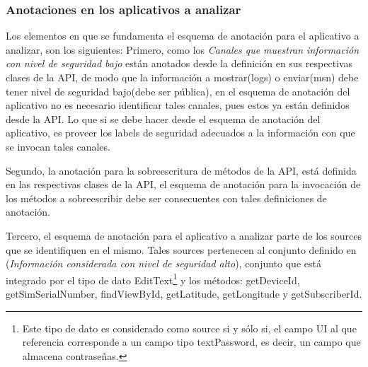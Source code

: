 \subsubsection{Anotaciones en los aplicativos a analizar}
Los elementos en que se fundamenta el esquema de anotación para el aplicativo a
analizar, son los siguientes:\newline 
Primero, como los \textit{Canales que muestran
información con nivel de seguridad bajo} están anotados desde la definición en
sus respectivas clases de la API, de modo que la información a mostrar(logs) o
enviar(msn) debe tener nivel de seguridad bajo(debe ser pública), en el esquema
de anotación del aplicativo no es necesario identificar tales canales, pues
estos ya están definidos desde la API. Lo que si se debe hacer desde el esquema
de anotación del aplicativo, es proveer los labels de seguridad adecuados a la
información con que se invocan tales canales.

Segundo, la anotación para la sobreescritura de métodos de la API, está definida
en las respectivas clases de la API, el esquema de anotación para la invocación
de los métodos a sobreescribir debe ser consecuentes con tales definiciones de
anotación.

Tercero, el esquema de anotación para el aplicativo a analizar parte de
los sources que se identifiquen en el mismo. Tales sources pertenecen al conjunto
definido en (\textit{Información considerada con nivel de seguridad alto}),
conjunto que está integrado por el tipo de dato EditText\footnote{Este tipo de
dato es considerado como source si y sólo si, el campo UI al que referencia
corresponde a un campo tipo textPassword, es decir, un campo que almacena
contraseñas.} y los métodos: getDeviceId, getSimSerialNumber, findViewById,
getLatitude, getLongitude y getSubscriberId.

